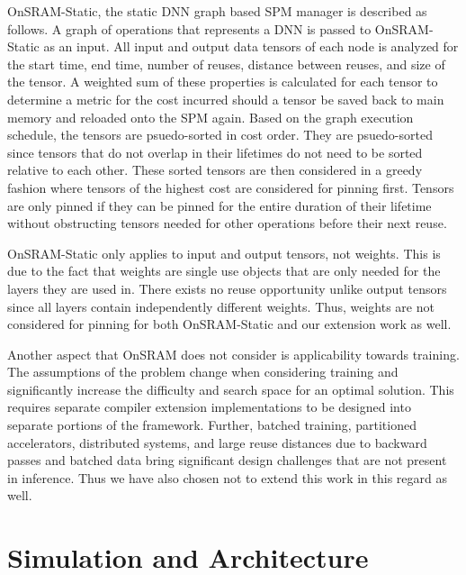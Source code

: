 OnSRAM-Static, the static DNN graph based SPM manager is described as follows.
A graph of operations that represents a DNN is passed to OnSRAM-Static as an
input. All input and output data tensors of each node is analyzed for the start
time, end time, number of reuses, distance between reuses, and size of the
tensor. A weighted sum of these properties is calculated for each tensor to
determine a metric for the cost incurred should a tensor be saved back to main
memory and reloaded onto the SPM again. Based on the graph execution schedule,
the tensors are psuedo-sorted in cost order. They are psuedo-sorted since
tensors that do not overlap in their lifetimes do not need to be sorted relative to
each other. These sorted tensors are then considered in a greedy fashion where
tensors of the highest cost are considered for pinning first. Tensors are only
pinned if they can be pinned for the entire duration of their lifetime without
obstructing tensors needed for other operations before their next reuse.

OnSRAM-Static only applies to input and output tensors, not weights. This is
due to the fact that weights are single use objects that are only needed for
the layers they are used in. There exists no reuse opportunity unlike output
tensors since all layers contain independently different weights. Thus, weights
are not considered for pinning for both OnSRAM-Static and our extension work as
well.

Another aspect that OnSRAM does not consider is applicability towards training.
The assumptions of the problem change when considering training and
significantly increase the difficulty and search space for an optimal solution.
This requires separate compiler extension implementations to be designed into
separate portions of the framework. Further, batched training, partitioned
accelerators, distributed systems, and large reuse distances due to backward
passes and batched data \cite{onsram} bring significant design challenges that
are not present in inference. Thus we have also chosen not to extend this work
in this regard as well.


\section{Simulation and Architecture}

